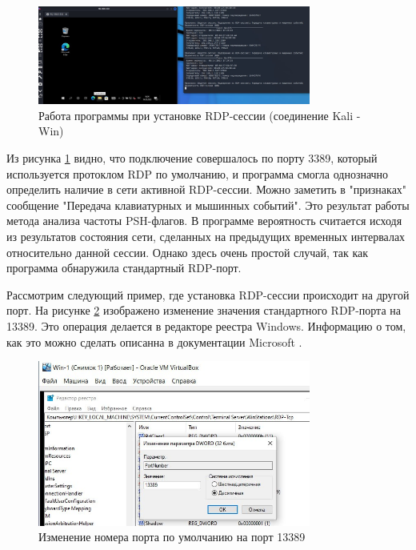 \documentclass[bachelor, och, coursework]{SCWorks}
\begin{document}
\begin{figure}[H]
  \centering
  \includegraphics[width=0.8\textwidth]{photo/rdp1.jpg}
  \caption{Работа программы при установке RDP-сессии (соединение Kali - Win) }
  \label{rdp1}
\end{figure}

Из рисунка \ref{rdp1} видно, что подключение совершалось по порту 3389, который используется протоклом RDP по умолчанию, и 
программа смогла однозначно определить наличие в сети активной RDP-сессии. Можно заметить в "признаках" сообщение "Передача клавиатурных и
мышинных событий". Это результат работы метода анализа частоты PSH-флагов. В программе вероятность считается исходя из результатов состояния сети,
сделанных на предыдущих временных интервалах относительно данной сессии. Однако здесь очень простой случай, так как программа обнаружила стандартный
RDP-порт. 

Рассмотрим следующий пример, где установка RDP-сессии происходит на другой порт. На рисунке \ref{rdpport1} изображено изменение
значения стандартного RDP-порта на 13389. Это операция делается в редакторе реестра Windows. Информацию о том, как это можно сделать
описанна в документации Microsoft \cite{rdpport}.


\begin{figure}[H]
  \centering
  \includegraphics[width=0.8\textwidth]{photo/rdpport1.jpg}
  \caption{Изменение номера порта по умолчанию на порт 13389}
  \label{rdpport1}
\end{figure}
\end{document}
